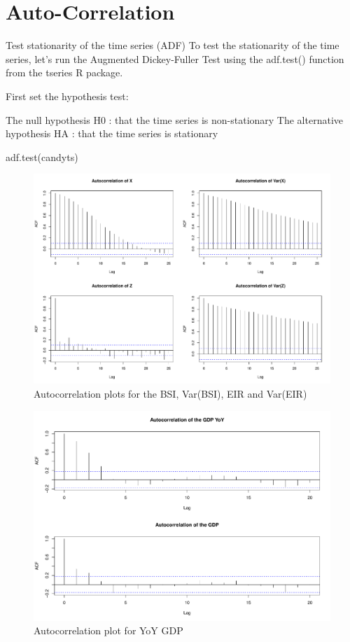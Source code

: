 \documentclass[12pt,a4paper,oneside]{book}
\begin{document}
\section{Auto-Correlation}

Test stationarity of the time series (ADF)
To test the stationarity of the time series, let’s run the Augmented Dickey-Fuller Test using the adf.test() function from the tseries R package.

First set the hypothesis test:

The null hypothesis H0 : that the time series is non-stationary The alternative hypothesis HA : that the time series is stationary

adf.test(candyts)

\begin{figure}[H]
    \centering
    \captionsetup{justification=centering}
    \includegraphics[scale=0.5]{Graphs/ACF.pdf}
    \caption{Autocorrelation plots for the BSI, Var(BSI), EIR and Var(EIR)}
    \label{fig:ACF}
\end{figure}

\begin{figure}[H]
    \centering
    \captionsetup{justification=centering}
    \includegraphics[scale=0.45]{Graphs/ACF_GDP.pdf}
    \caption{Autocorrelation plot for YoY GDP}
    \label{fig:ACF_GDP}
\end{figure}
\end{document}
